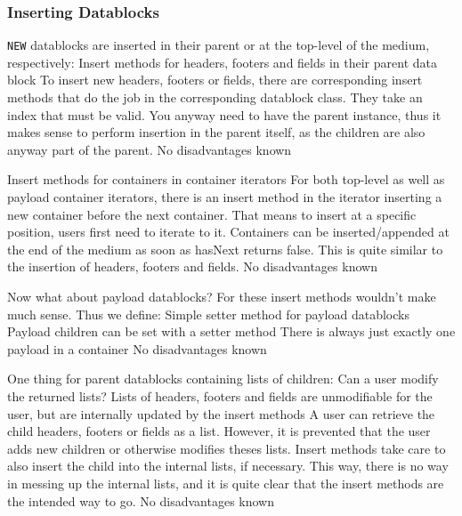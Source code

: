 \subsubsection{Inserting Datablocks}%
\label{sec:InsertingDatablocks}%

\texttt{NEW} datablocks are inserted in their parent or at the top-level of the medium, respectively:
{%
Insert methods for headers, footers and fields in their parent data block
}
{%
To insert new headers, footers or fields, there are corresponding insert methods that do the job in the corresponding datablock class. They take an index that must be valid.
}
{%
You anyway need to have the parent instance, thus it makes sense to perform insertion in the parent itself, as the children are also anyway part of the parent.
}
{%
No disadvantages known
}

{%
Insert methods for containers in container iterators
}
{%
For both top-level as well as payload container iterators, there is an insert method in the iterator inserting a new container before the next container. That means to insert at a specific position, users first need to iterate to it. Containers can be inserted/appended at the end of the medium as soon as hasNext returns false. 
}
{%
This is quite similar to the insertion of headers, footers and fields.
}
{%
No disadvantages known
}

Now what about payload datablocks? For these insert methods wouldn't make much sense. Thus we define:
{%
Simple setter method for payload datablocks
}
{%
Payload children can be set with a setter method
}
{%
There is always just exactly one payload in a container
}
{%
No disadvantages known
}

One thing for parent datablocks containing lists of children: Can a user modify the returned lists?
{%
Lists of headers, footers and fields are unmodifiable for the user, but are internally updated by the insert methods
}
{%
A user can retrieve the child headers, footers or fields as a list. However, it is prevented that the user adds new children or otherwise modifies theses lists. Insert methods take care to also insert the child into the internal lists, if necessary.
}
{%
This way, there is no way in messing up the internal lists, and it is quite clear that the insert methods are the intended way to go.
}
{%
No disadvantages known
}


